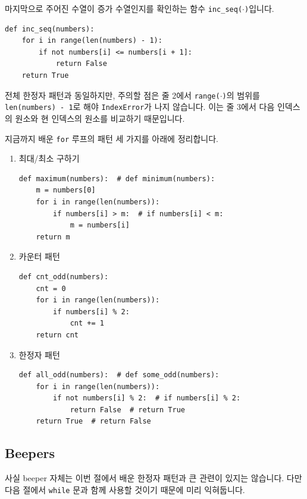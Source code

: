 \documentclass[../main.tex]{subfiles}
\begin{document}
마지막으로 주어진 수열이 증가 수열인지를 확인하는 함수 \texttt{inc\_seq($\cdot$)}입니다.
\begin{verbatim}
def inc_seq(numbers):
    for i in range(len(numbers) - 1):
        if not numbers[i] <= numbers[i + 1]:
            return False
    return True
\end{verbatim}
전체 한정자 패턴과 동일하지만, 주의할 점은 줄 2에서 \texttt{range($\cdot$)}의 범위를 \texttt{len(numbers) - 1}로 해야 \texttt{IndexError}가 나지 않습니다.
이는 줄 3에서 다음 인덱스의 원소와 현 인덱스의 원소를 비교하기 때문입니다.

지금까지 배운 \texttt{for} 루프의 패턴 세 가지를 아래에 정리합니다.
\begin{enumerate}
\item 최대/최소 구하기
\begin{verbatim}
def maximum(numbers):  # def minimum(numbers):
    m = numbers[0]
    for i in range(len(numbers)):
        if numbers[i] > m:  # if numbers[i] < m:
            m = numbers[i]
    return m
\end{verbatim}
\item 카운터 패턴
\begin{verbatim}
def cnt_odd(numbers):
    cnt = 0
    for i in range(len(numbers)):
        if numbers[i] % 2:
            cnt += 1
    return cnt
\end{verbatim}
\item 한정자 패턴
\begin{verbatim}
def all_odd(numbers):  # def some_odd(numbers):
    for i in range(len(numbers)):
        if not numbers[i] % 2:  # if numbers[i] % 2:
            return False  # return True
    return True  # return False
\end{verbatim}
\end{enumerate}

\subsection{Beepers}
사실 beeper 자체는 이번 절에서 배운 한정자 패턴과 큰 관련이 있지는 않습니다.
다만 다음 절에서 \texttt{while} 문과 함께 사용할 것이기 때문에 미리 익혀둡니다.
\end{document}
